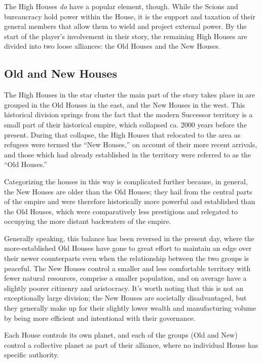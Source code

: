 \documentclass[11pt]{report}
\begin{document}
    The High Houses \emph{do} have a popular element, though. While the Scions and bureaucracy hold power within the House, it is the support and taxation of their general members that allow them to wield and project external power. By the start of the player's involvement in their story, the remaining High Houses are divided into two loose alliances: the Old Houses and the New Houses.
    
    \subsection{Old and New Houses}
    The High Houses in the star cluster the main part of the story takes place in are grouped in the Old Houses in the east, and the New Houses in the west. This historical division springs from the fact that the modern Successor territory is a small part of their historical empire, which collapsed ca. 2000 years before the present. During that collapse, the High Houses that relocated to the area as refugees were termed the ``New Houses,'' on account of their more recent arrivals, and those which had already established in the territory were referred to as the ``Old Houses.'' 
    
    Categorizing the houses in this way is complicated further because, in general, the New Houses are older than the Old Houses; they hail from the central parts of the empire and were therefore historically more powerful and established than the Old Houses, which were comparatively less prestigious and relegated to occupying the more distant backwaters of the empire. 
    
    Generally speaking, this balance has been reversed in the present day, where the more-established Old Houses have gone to great effort to maintain an edge over their newer counterparts even when the relationship between the two groups is peaceful. The New Houses control a smaller and less comfortable territory with fewer natural resources, comprise a smaller population, and on average have a slightly poorer citizenry and aristocracy. It's worth noting that this is not an exceptionally large division; the New Houses are societally disadvantaged, but they generally make up for their slightly lower wealth and manufacturing volume by being more efficient and intentional with their governance.

    Each House controls its own planet, and each of the groups (Old and New) control a collective planet as part of their alliance, where no individual House has specific authority.
\end{document}
